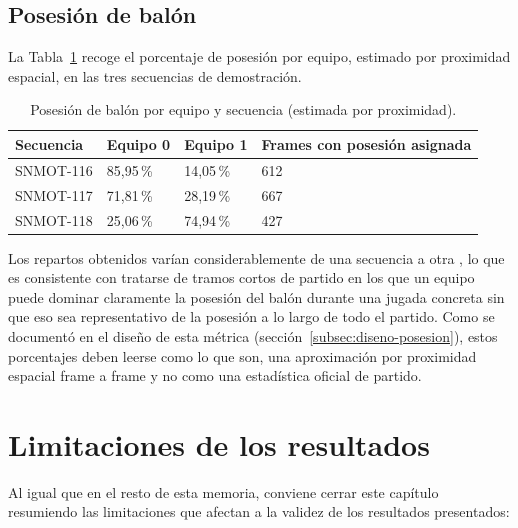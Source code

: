 \FloatBarrier

\subsection{Posesión de balón}

La Tabla~\ref{tab:pruebas-posesion} recoge el porcentaje de posesión por
equipo, estimado por proximidad espacial, en las tres secuencias de
demostración.

\begin{table}[htp]
\centering
\caption{Posesión de balón por equipo y secuencia (estimada por proximidad).}
\label{tab:pruebas-posesion}
\renewcommand{\arraystretch}{1.25}
\begin{tabular}{|p{2.4cm}|p{2.6cm}|p{2.6cm}|p{2.6cm}|}
\hline
\rowcolor{gray!25}
\textbf{Secuencia} & \textbf{Equipo 0} & \textbf{Equipo 1} & \textbf{Frames con posesión asignada} \\
\hline
SNMOT-116 & 85{,}95\,\% & 14{,}05\,\% & 612 \\
\hline
SNMOT-117 & 71{,}81\,\% & 28{,}19\,\% & 667 \\
\hline
SNMOT-118 & 25{,}06\,\% & 74{,}94\,\% & 427 \\
\hline
\end{tabular}
\end{table}

Los repartos obtenidos varían considerablemente de una secuencia a otra
, lo que es consistente con tratarse de tramos
cortos de partido en los que un equipo puede
dominar claramente la posesión del balón durante una jugada concreta sin
que eso sea representativo de la posesión a lo largo de todo el partido.
Como se documentó en el diseño de esta métrica
(sección~\ref{subsec:diseno-posesion}), estos porcentajes deben leerse como
lo que son, una aproximación por proximidad espacial frame a frame y no como una estadística oficial de
partido.

\section{Limitaciones de los resultados}
\label{sec:pruebas-limitaciones}

Al igual que en el resto de esta memoria, conviene cerrar este capítulo
resumiendo las limitaciones que afectan a la validez de
los resultados presentados:

